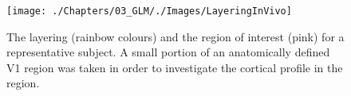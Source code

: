 \begin{figure}[ht]
\centering
\texttt{[image: ./Chapters/03\_GLM/./Images/LayeringInVivo]}
\caption{The layering (rainbow colours) and the region of interest (pink) for a representative subject. A small portion of an anatomically defined V1 region was taken in order to investigate the cortical profile in the region.}
\label{fig:invivovolume}
\end{figure}